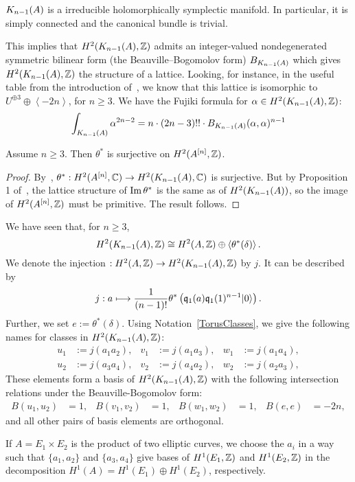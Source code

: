 \begin{theorem}\cite[Th\'eor\`eme 4]{Beauville}
$\kum{A}{n-1}$ is a irreducible holomorphically symplectic manifold. In particular, it is simply connected and the canonical bundle is trivial.
\end{theorem}
This implies that $H^2(\kum{A}{n-1},\Z)$ admits an integer-valued nondegenerated symmetric bilinear form (the Beauville--Bogomolov form) $B_{\kum{A}{n-1}}$ which gives $H^2(\kum{A}{n-1},\Z)$ the structure of a lattice. Looking, for instance, in the useful table from the introduction of~\cite{Rapagnetta}, we know that this lattice is
isomorphic to $U^{\oplus 3}\oplus \left< -2n \right>$, for $n\geq 3$. 
We have the Fujiki formula for $\alpha\in H^2(\kum{A}{n-1},\Z)$:
\begin{equation} \label{fujiki}
\int_{\kum{A}{n-1}} \alpha^{2n-2} = n\cdot(2n-3)!!\cdot B_{\kum{A}{n-1}}(\alpha,\alpha)^{n-1}
\end{equation}

\begin{proposition}\label{H2Sur} Assume $n\geq 3$. Then
$\theta^*$ is surjective on $H^2(A\hilb{n},\Z)$.
\end{proposition}
\begin{proof}
By~\cite[Sect.~7]{Beauville}, $\theta^{\ast} : H^2(A\hilb{n},\C) \rightarrow H^2(\kum{A}{n-1},\C)$ is surjective. 
But by Proposition 1 of~\cite{Britze}, the lattice structure of $\im \theta^*$ is the same as of $H^2(\kum{A}{n-1})$, so the image of $H^2(A\hilb{n},\Z)$ must be primitive. The result follows.
\end{proof}
\begin{notation}\label{BasisH2KA}
 We have seen that, for $n\geq 3$,
 $$
 H^2(\kum{A}{n-1},\Z) \cong H^2(A,\Z) \oplus\left<\theta^*(\delta)\right>.
 $$
We denote the injection $ : H^2(A,\Z) \rightarrow H^2(\kum{A}{n-1},\Z)$ by $j$. It can be described by 
$$
j : a \longmapsto \frac{1}{(n-1)!}\theta^*\left(\q_1(a)\q_1(1)^{n-1}\vac\right).
$$ 
Further, we set $e:=\theta^*(\delta)$. Using Notation~\ref{TorusClasses}, we give the following names for classes in $H^2(\kum{A}{n-1},\Z)$:
\begin{align*}
u_1 &:= j(a_1 a_2), & v_1 &:= j(a_1 a_3), & w_1 &:= j(a_1 a_4), \\ 
u_2 &:= j(a_3 a_4), & v_2 &:= j(a_4 a_2), & w_2 &:= j(a_2 a_3),
\end{align*}
These elements form a basis of $H^2(\kum{A}{n-1},\Z)$ with the following intersection relations under the Beauville-Bogomolov form:
\begin{align*}
B(u_1,u_2) &= 1, & B(v_1,v_2) &= 1, & B(w_1,w_2) &= 1,  &
B(e,e)&= -2n,
\end{align*}
and all other pairs of basis elements are orthogonal.

If $A=E_1\times E_2$ is the product of two elliptic curves, we choose the $a_i$ in a way such that $\{a_1,a_2\}$ 
and $\{a_3,a_4\}$ give bases of $H^1(E_1,\Z)$ and $H^1(E_2,\Z)$ in the decomposition $H^1(A) = H^1(E_1)\oplus H^1(E_2)$, respectively.
\end{notation}

